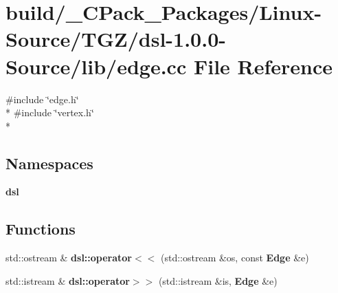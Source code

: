 \section{build/\-\_\-\-C\-Pack\-\_\-\-Packages/\-Linux-\/\-Source/\-T\-G\-Z/dsl-\/1.0.0-\/\-Source/lib/edge.cc File Reference}
\label{build_2__CPack__Packages_2Linux-Source_2TGZ_2dsl-1_80_80-Source_2lib_2edge_8cc}
{\ttfamily \#include \char`\"{}edge.\-h\char`\"{}}\\*
{\ttfamily \#include \char`\"{}vertex.\-h\char`\"{}}\\*
\subsection*{Namespaces}
\begin{DoxyCompactItemize}
\item 
{\bf dsl}
\end{DoxyCompactItemize}
\subsection*{Functions}
\begin{DoxyCompactItemize}
\item 
std\-::ostream \& {\bf dsl\-::operator$<$$<$} (std\-::ostream \&os, const {\bf Edge} \&e)
\item 
std\-::istream \& {\bf dsl\-::operator$>$$>$} (std\-::istream \&is, {\bf Edge} \&e)
\end{DoxyCompactItemize}

